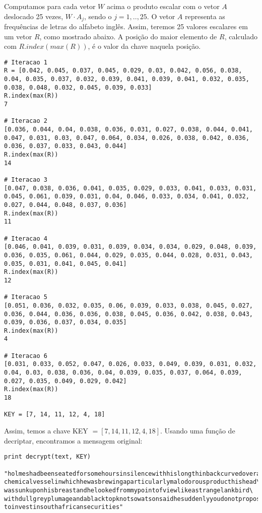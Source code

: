 \documentclass[a4paper]{article}
\begin{document}
Computamos para cada vetor $W$ acima o produto escalar com o vetor $A$ deslocado 25 vezes, $W \cdot A_j$,
sendo o $j = 1, .., 25$. O vetor $A$ representa as frequências de letras do alfabeto inglês. Assim,
teremos 25 valores escalares em um vetor $R$, como mostrado abaixo. A posição do maior elemento de $R$,
calculado com $R.index(max(R))$, é o valor da chave naquela posição.

\begin{lstlisting}
# Iteracao 1
R = [0.042, 0.045, 0.037, 0.045, 0.029, 0.03, 0.042, 0.056, 0.038, 0.04, 0.035, 0.037, 0.032, 0.039, 0.041, 0.039, 0.041, 0.032, 0.035, 0.038, 0.048, 0.032, 0.045, 0.039, 0.033]
R.index(max(R))
7

# Iteracao 2
[0.036, 0.044, 0.04, 0.038, 0.036, 0.031, 0.027, 0.038, 0.044, 0.041, 0.047, 0.031, 0.03, 0.047, 0.064, 0.034, 0.026, 0.038, 0.042, 0.036, 0.036, 0.037, 0.033, 0.043, 0.044]
R.index(max(R))
14

# Iteracao 3
[0.047, 0.038, 0.036, 0.041, 0.035, 0.029, 0.033, 0.041, 0.033, 0.031, 0.045, 0.061, 0.039, 0.031, 0.04, 0.046, 0.033, 0.034, 0.041, 0.032, 0.027, 0.044, 0.048, 0.037, 0.036]
R.index(max(R))
11

# Iteracao 4
[0.046, 0.041, 0.039, 0.031, 0.039, 0.034, 0.034, 0.029, 0.048, 0.039, 0.036, 0.035, 0.061, 0.044, 0.029, 0.035, 0.044, 0.028, 0.031, 0.043, 0.035, 0.031, 0.041, 0.045, 0.041]
R.index(max(R))
12

# Iteracao 5
[0.051, 0.036, 0.032, 0.035, 0.06, 0.039, 0.033, 0.038, 0.045, 0.027, 0.036, 0.044, 0.036, 0.036, 0.038, 0.045, 0.036, 0.042, 0.038, 0.043, 0.039, 0.036, 0.037, 0.034, 0.035]
R.index(max(R))
4

# Iteracao 6
[0.031, 0.033, 0.052, 0.047, 0.026, 0.033, 0.049, 0.039, 0.031, 0.032, 0.04, 0.03, 0.038, 0.036, 0.04, 0.039, 0.035, 0.037, 0.064, 0.039, 0.027, 0.035, 0.049, 0.029, 0.042]
R.index(max(R))
18

KEY = [7, 14, 11, 12, 4, 18]
\end{lstlisting}

Assim, temos a chave KEY $= [7, 14, 11, 12, 4, 18]$. Usando uma função de decriptar, encontramos a mensagem original:

\begin{lstlisting}
print decrypt(text, KEY)

"holmeshadbeenseatedforsomehoursinsilencewithhislongthinbackcurvedovera\
chemicalvesselinwhichhewasbrewingaparticularlymalodorousproducthishead\
wassunkuponhisbreastandhelookedfrommypointofviewlikeastrangelankbird\
withdullgreyplumageandablacktopknotsowatsonsaidhesuddenlyyoudonotpropose\
toinvestinsouthafricansecurities"
\end{lstlisting}
\end{document}

